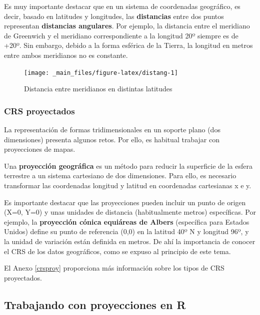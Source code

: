 \documentclass[
]{report}
\begin{document}
Es muy importante destacar que en un sistema de coordenadas geográfico, es
decir, basado en latitudes y longitudes, las \textbf{distancias} entre dos puntos
representan \textbf{distancias angulares}. Por ejemplo, la distancia entre el
meridiano de Greenwich y el meridiano correspondiente a la longitud 20º siempre
es de +20º. Sin embargo, debido a la forma esférica de la Tierra, la longitud en
metros entre ambos meridianos no es constante.

\begin{figure}

{\centering \texttt{[image: \_main\_files/figure-latex/distang-1]} 

}

\caption{Distancia entre meridianos en distintas latitudes}\label{fig:distang}
\end{figure}

\hypertarget{crs-proyectados}{%
\subsubsection{CRS proyectados}\label{crs-proyectados}}

La representación de formas tridimensionales en un soporte plano (dos
dimensiones) presenta algunos retos. Por ello, es habitual trabajar con
proyecciones de mapas.

Una \textbf{proyección geográfica} es un método para reducir la superficie de la
esfera terrestre a un sistema cartesiano de dos dimensiones. Para ello, es
necesario transformar las coordenadas longitud y latitud en coordenadas
cartesianas x e y.

Es importante destacar que las proyecciones pueden incluir un punto de origen
(X=0, Y=0) y unas unidades de distancia (habitualmente metros) específicas. Por
ejemplo, la \textbf{proyección cónica equiáreas de Albers} (específica para Estados
Unidos) define su punto de referencia (0,0) en la latitud 40º N y longitud 96º,
y la unidad de variación están definida en metros. De ahí la importancia de
conocer el CRS de los datos geográficos, como se expuso al principio de este
tema.

El Anexo \ref{crsproy} proporciona más información sobre los tipos de CRS
proyectados.

\hypertarget{trabajando-con-proyecciones-en-r}{%
\subsection{Trabajando con proyecciones en R}\label{trabajando-con-proyecciones-en-r}}
\end{document}
